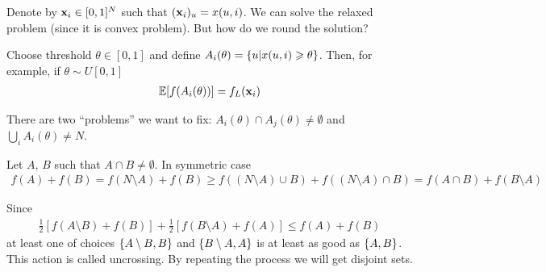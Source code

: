 Denote by $\vb{x}_i \in [0,1]^N$ such that $(\vb{x}_i)_u = x(u,i)$. We can solve the relaxed problem (since it is convex problem). But how do we round the solution?

Choose threshold $\theta \in [0,1]$ and define $A_i(\theta) = \qty{u| x(u,i) \geqslant \theta}$. Then, for example, if $\theta \sim U[0,1]$
\begin{align}
\mathbb{E} [f(A_i(\theta))] = f_L(\vb{x}_i)
\end{align}

There are two ``problems'' we want to fix: $A_i(\theta) \cap A_j(\theta) \neq \emptyset $ and $\bigcup_i A_i(\theta) \neq N$.

Let $A$, $B$ such that $A\cap B \neq \emptyset $. In symmetric case
\begin{align}
f(A)+f(B) = f(N\setminus A) + f(B) \geqslant f((N\setminus A) \cup B) + f((N\setminus A) \cap B) = f(A\cap B) + f(B\setminus A)
\end{align}

Since
\begin{align}
\frac{1}{2}[f(A\setminus B) + f(B)] + \frac{1}{2}[f(B\setminus A) + f(A)] \leqslant f(A) + f(B)
\end{align}
at least one of choices $\qty{A\setminus B, B}$ and $\qty{B\setminus A, A}$ is at least as good as $\qty{A,B}$. This action is called uncrossing. By repeating the process we will get disjoint sets.

